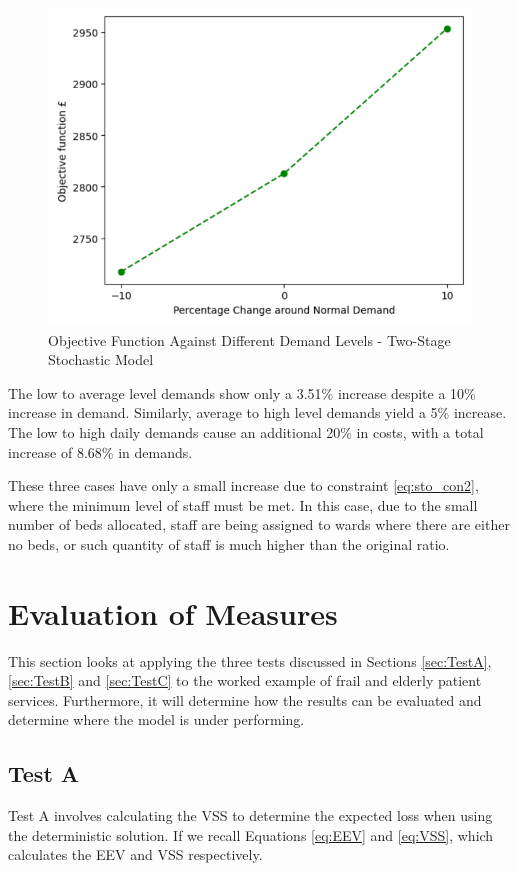 \documentclass[../thesis.tex]{subfiles}
\begin{document}
{\begin{figure}[h!]
    \centering
    \includegraphics[scale=0.75]{Chapters/Chapter4New/Figures/WEStochastic.png}
    \caption{Objective Function Against Different Demand Levels - Two-Stage Stochastic Model}
    \label{fig:WEStochastic}
\end{figure}

The low to average level demands show only a 3.51\% increase despite a 10\% increase in demand. Similarly, average to high level demands yield a 5\% increase. The low to high daily demands cause an additional 20\% in costs, with a total increase of 8.68\% in demands.

These three cases have only a small increase due to constraint \eqref{eq:sto_con2}, where the minimum level of staff must be met. In this case, due to the small number of beds allocated, staff are being assigned to wards where there are either no beds, or such quantity of staff is much higher than the original ratio.


\section{Evaluation of Measures}\label{sec:evalofmeasures}
This section looks at applying the three tests discussed in Sections \ref{sec:TestA}, \ref{sec:TestB} and \ref{sec:TestC} to the worked example of frail and elderly patient services. Furthermore, it will determine how the results can be evaluated and determine where the model is under performing.


\subsection{Test A}
Test A involves calculating the VSS to determine the expected loss when using the deterministic solution. If we recall Equations \eqref{eq:EEV} and \eqref{eq:VSS}, which calculates the EEV and VSS respectively.

}
\end{document}
